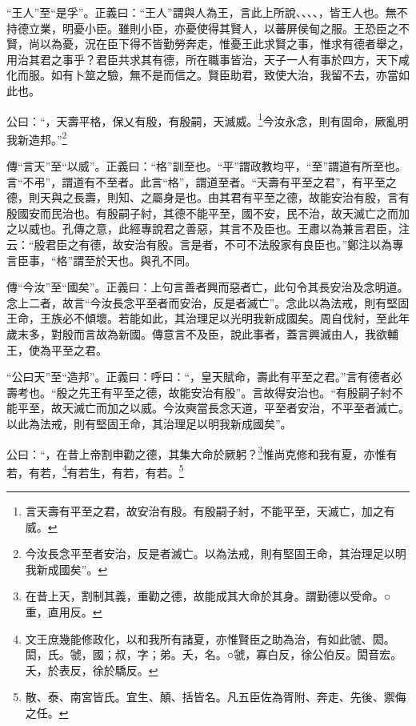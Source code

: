 {\noindent\shu{}\fzkt “王人”至“是孚”。正義曰：“王人”謂與人為王，言此上所說、、、、，皆王人也。無不持德立業，明憂小臣。雖則小臣，亦憂使得其賢人，以蕃屏侯甸之服。王恐臣之不賢，尚以為憂，況在臣下得不皆勤勞奔走，惟憂王此求賢之事，惟求有德者舉之，用治其君之事乎？君臣共求其有德，所在職事皆治，天子一人有事於四方，天下咸化而服。如有卜筮之驗，無不是而信之。賢臣助君，致使大治，我留不去，亦當如此也。 \par}

公曰：“，天壽平格，保乂有殷，有殷嗣，天滅威。\footnote{言天壽有平至之君，故安治有殷。有殷嗣子紂，不能平至，天滅亡，加之有威。}今汝永念，則有固命，厥亂明我新造邦。”\footnote{今汝長念平至者安治，反是者滅亡。以為法戒，則有堅固王命，其治理足以明我新成國矣”。}


{\noindent\zhuan{}\fzbyks 傳“言天”至“以威”。正義曰：“格”訓至也。“平”謂政教均平，“至”謂道有所至也。言“不弔”，謂道有不至者。此言“格”，謂道至者。“天壽有平至之君”，有平至之德，則天與之長壽，則知、之屬身是也。由其君有平至之德，故能安治有殷，言有殷國安而民治也。有殷嗣子紂，其德不能平至，國不安，民不治，故天滅亡之而加之以威也。孔傳之意，此經專說君之善惡，其言不及臣也。王肅以為兼言君臣，注云：“殷君臣之有德，故安治有殷。言是者，不可不法殷家有良臣也。”鄭注以為專言臣事，“格”謂至於天也。與孔不同。 \par}

{\noindent\zhuan{}\fzbyks 傳“今汝”至“國矣”。正義曰：上句言善者興而惡者亡，此句令其長安治及念明道。念上二者，故言“今汝長念平至者而安治，反是者滅亡”。念此以為法戒，則有堅固王命，王族必不傾壞。若能如此，其治理足以光明我新成國矣。周自伐紂，至此年歲末多，對殷而言故為新國。傳意言不及臣，說此事者，蓋言興滅由人，我欲輔王，使為平至之君。 \par}

{\noindent\shu{}\fzkt “公曰天”至“造邦”。正義曰：呼曰：“，皇天賦命，壽此有平至之君。”言有德者必壽考也。“殷之先王有平至之德，故能安治有殷”。言故得安治也。“有殷嗣子紂不能平至，故天滅亡而加之以威。今汝奭當長念天道，平至者安治，不平至者滅亡。以此為法戒，則有堅固王命，其治理足以明我新成國矣”。 \par}

公曰：“，在昔上帝割申勸之德，其集大命於厥躬？\footnote{在昔上天，割制其義，重勸之德，故能成其大命於其身。謂勤德以受命。○重，直用反。}惟尚克修和我有夏，亦惟有若，有若，\footnote{文王庶幾能修政化，以和我所有諸夏，亦惟賢臣之助為治，有如此虢、閎。閎，氏。虢，國；叔，字；弟。夭，名。○虢，寡白反，徐公伯反。閎音宏。夭，於表反，徐於驕反。}有若生，有若，有若。\footnote{散、泰、南宮皆氏。宜生、顛、括皆名。凡五臣佐為胥附、奔走、先後、禦侮之任。}


